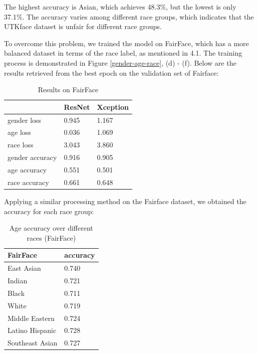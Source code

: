 \documentclass[DIV=calc, paper=a4, fontsize=10pt, twocolumn]{article}
\begin{document}
	The highest accuracy is Asian, which achieves 48.3\%, but the lowest is only 37.1\%. The accuracy varies among different race groups, which indicates that the UTKface dataset is unfair for different race groups.
	
	To overcome this problem, we trained the model on FairFace, which has a more balanced dataset in terms of the race label, as mentioned in 4.1. The training process is demonstrated in Figure \ref{gender-age-race}, (d) - (f). Below are the results retrieved from the best epoch on the validation set of Fairface:
	
	\begin{table}[H]
		\centering
		\begin{tabular}{|l|l|l|}
			\hline
			  & ResNet & Xception \\ \hline
			gender loss     & 0.945  & 1.167    \\ \hline
			age loss        & 0.036  & 1.069     \\ \hline
			race loss       & 3.043  & 3.860     \\ \hline
			gender accuracy & 0.916  & 0.905	    \\ \hline
			age accuracy    & 0.551  & 0.501     \\ \hline
			race accuracy   & 0.661  & 0.648    \\ \hline
		\end{tabular}
		\caption{Results on FairFace}
	\end{table}
	
	Applying a similar processing method on the Fairface dataset, we obtained the accuracy for each race group:
	
	\begin{table}[H]
		\centering
		\begin{tabular}{|l|l|}
			\hline
			\textbf{FairFace} & \textbf{accuracy}  \\ \hline 
			East Asian 		 & 0.740 \\ \hline
			Indian           & 0.721 \\ \hline 
			Black            & 0.711 \\ \hline
			White            & 0.719 \\ \hline
			Middle Eastern   & 0.724 \\ \hline
			Latino Hispanic  & 0.728 \\ \hline
			Southeast Asian  & 0.727 \\ \hline
		\end{tabular}
		\caption{Age accuracy over different races (FairFace)}
	\end{table}
\end{document}
